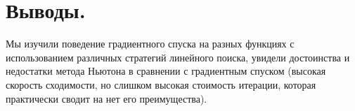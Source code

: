 \documentclass[11pt]{article}
\begin{document}
\section{Выводы.}
Мы изучили поведение градиентного спуска на разных функциях с использованием различных стратегий линейного поиска, увидели достоинства и недостатки метода Ньютона в сравнении с градиентным спуском (высокая скорость сходимости, но слишком высокая стоимость итерации, которая практически сводит на нет его преимущества). 
\end{document}
